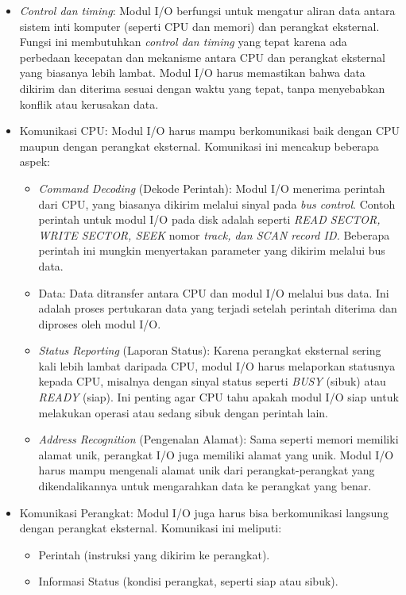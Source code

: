 \documentclass[12pt]{article}
\begin{document}
\begin{itemize} 
    \item \textit{Control dan timing}: Modul I/O berfungsi untuk mengatur aliran data antara sistem inti komputer (seperti CPU dan memori) dan perangkat eksternal. Fungsi ini membutuhkan \textit{control dan timing} yang tepat karena ada perbedaan kecepatan dan mekanisme antara CPU dan perangkat eksternal yang biasanya lebih lambat. Modul I/O harus memastikan bahwa data dikirim dan diterima sesuai dengan waktu yang tepat, tanpa menyebabkan konflik atau kerusakan data. 
    \item Komunikasi CPU: Modul I/O harus mampu berkomunikasi baik dengan CPU maupun dengan perangkat eksternal. Komunikasi ini mencakup beberapa aspek: 
    \begin{itemize} 
        \item \textit{Command Decoding} (Dekode Perintah): Modul I/O menerima perintah dari CPU, yang biasanya dikirim melalui sinyal pada \textit{bus control}. Contoh perintah untuk modul I/O pada disk adalah seperti \textit{READ SECTOR, WRITE SECTOR, SEEK} nomor \textit{track, dan SCAN record ID.} Beberapa perintah ini mungkin menyertakan parameter yang dikirim melalui bus data. 
        \item Data: Data ditransfer antara CPU dan modul I/O melalui bus data. Ini adalah proses pertukaran data yang terjadi setelah perintah diterima dan diproses oleh modul I/O. 
        \item \textit{Status Reporting} (Laporan Status): Karena perangkat eksternal sering kali lebih lambat daripada CPU, modul I/O harus melaporkan statusnya kepada CPU, misalnya dengan sinyal status seperti \textit{BUSY} (sibuk) atau \textit{READY} (siap). Ini penting agar CPU tahu apakah modul I/O siap untuk melakukan operasi atau sedang sibuk dengan perintah lain. 
        \item \textit{Address Recognition} (Pengenalan Alamat): Sama seperti memori memiliki alamat unik, perangkat I/O juga memiliki alamat yang unik. Modul I/O harus mampu mengenali alamat unik dari perangkat-perangkat yang dikendalikannya untuk mengarahkan data ke perangkat yang benar. \end{itemize} 
    \item Komunikasi Perangkat: Modul I/O juga harus bisa berkomunikasi langsung dengan perangkat eksternal. Komunikasi ini meliputi: 
    \begin{itemize} 
        \item Perintah (instruksi yang dikirim ke perangkat). \item Informasi Status (kondisi perangkat, seperti siap atau sibuk). 

\end{itemize}
\end{itemize}
\end{document}
